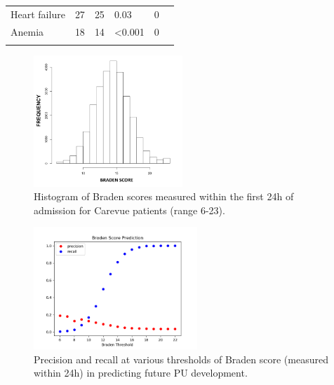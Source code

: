 \documentclass{ws-procs11x85}
\begin{document}
\begin{table}[H]
\begin{adjustbox}{width=1\textwidth}
\begin{tabular}{llllll}
\hspace{1cm} Heart failure                                & 27                                      & 25                                  & 0.03             & 0                       &  \\
\hspace{1cm} Anemia                                       & 18                                      & 14                                  & \textless 0.001  & 0                       &  \\
                                             &                                         &                                     &                  &                         & 
\end{tabular}
\end{adjustbox}
\end{table}    
    
    
    


\begin{figure}[H]
  \centering
  \includegraphics[width=0.5\textwidth]{figures/braden_hist.png}
  \caption{\label{braden-hist}\footnotesize Histogram of Braden scores measured within the first 24h of admission for Carevue patients (range 6-23).}
\end{figure}

\begin{figure}[H]
  \centering
  \includegraphics[width=0.55\textwidth]{figures/braden-precision-recall.png}
  \caption{\label{fig-braden}\footnotesize Precision and recall at various thresholds of Braden score (measured within 24h) in predicting future PU development.}
\end{figure}
\end{document}
